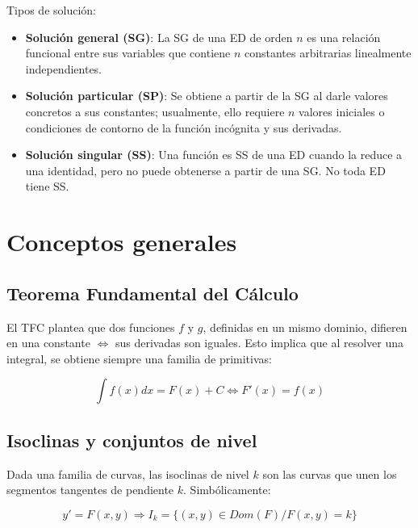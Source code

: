 \documentclass{article}
\begin{document}
Tipos de solución:

\begin{itemize}
\item \textbf{Solución general (SG)}: La SG de una ED de orden $n$ es una relación funcional entre sus variables 
que contiene $n$ constantes arbitrarias linealmente independientes.

\item \textbf{Solución particular (SP)}: Se obtiene a partir de la SG al darle valores concretos a sus constantes; usualmente, ello requiere $n$ valores iniciales o condiciones de contorno de la función incógnita y sus derivadas.

\item \textbf{Solución singular (SS)}: Una función es SS de una ED cuando la reduce a una identidad, pero no puede obtenerse a partir de una SG. No toda ED tiene SS.
\end{itemize}

\newpage

\section{Conceptos generales}

\subsection{Teorema Fundamental del Cálculo}

El TFC plantea que dos funciones $f$ y $g$, definidas en un mismo dominio, difieren en una constante $\Leftrightarrow$ sus derivadas son iguales. Esto implica que al resolver una integral, se obtiene siempre una familia de primitivas:

\begin{equation}
\int f(x) dx = F(x) + C \Leftrightarrow F'(x) = f(x)
\end{equation}

\subsection{Isoclinas y conjuntos de nivel}

Dada una familia de curvas, las isoclinas de nivel $k$ son las curvas que unen los segmentos tangentes de pendiente $k$. Simbólicamente:

\begin{equation}
y' = F(x,y) \Rightarrow I_k = \{(x,y) \in Dom(F) / F(x,y) = k\}
\end{equation}
\end{document}
